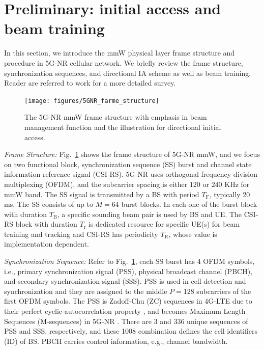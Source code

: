 \documentclass[journal]{IEEEtran}
\newcommand{\TSS}[0]{T_{\text{F}}}
\begin{document}
\section{Preliminary: initial access and beam training}
\label{sec:preliminary}
In this section, we introduce the mmW physical layer frame structure and procedure in 5G-NR cellular network. We briefly review the frame structure, synchronization sequences, and directional IA scheme as well as beam training. Reader are referred to work \cite{Giordani_beam_turotial_arxiv_1804} for a more detailed survey.
\begin{figure}
\begin{center}
\texttt{[image: figures/5GNR\_farme\_structure]}
\end{center}
\vspace{-4mm}
\caption{The 5G-NR mmW frame structure with emphasis in beam management function and the illustration for directional initial access.}
\vspace{-4mm}
\label{fig:frame_structure}
\end{figure}

\textit{Frame Structure:} Fig.~\ref{fig:frame_structure} shows the frame structure of 5G-NR mmW, and we focus on two functional block, synchronization sequence (SS) burst and channel state information reference signal (CSI-RS). 5G-NR uses orthogonal frequency division multiplexing (OFDM), and the subcarrier spacing is either $120 \text{ or } 240$ KHz for mmW band. The SS signal is transmitted by a BS with period $\TSS$, typically 20 ms. The SS consists of up to $M=64$ burst blocks. In each one of the burst block with duration $T_{\text{B}}$, a specific sounding beam pair is used by BS and UE. The CSI-RS block with duration $T_{\text{r}}$ is dedicated resource for specific UE(s) for beam training and tracking and CSI-RS has periodicity $T_{\text{R}}$, whose value is implementation dependent.

\textit{Synchronization Sequence:}
Refer to Fig.~\ref{fig:frame_structure}, each SS burst has 4 OFDM symbols, i.e., primary synchronization signal (PSS), physical broadcast channel (PBCH), and secondary synchronization signal (SSS). PSS is used in cell detection and synchronization and they are assigned to the middle $P=128$ subcarriers of the first OFDM symbols. \color{black} The PSS is Zadoff-Chu (ZC) sequences in 4G-LTE due to their perfect cyclic-autocorrelation property \cite{4373412}, and becomes Maximum Length Sequences (M-sequences) in 5G-NR \cite{3GPP_modulation}. There are 3 and 336 unique sequences of PSS and SSS, respectively, and these 1008 combination defines the cell identifiers (ID) of BS. PBCH carries control information, e.g., channel bandwidth. \color{black}
\end{document}
